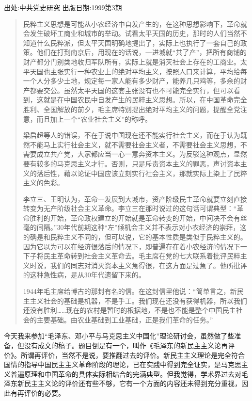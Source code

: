 \documentclass[UTF8, 12pt, a4paper]{ctexrep}
\begin{document}
出处:中共党史研究 出版日期:1999第3期

\begin{quotation}
    \footnotesize {
    民粹主义思想是可能从小农经济中自发产生的，在这种思想影响下，革命就会发生破坏工商业和城市的举动。试看太平天国的历史，那时的人们当然不知道什么民粹派，但太平天国明确地提出了，实际上也执行了一套自己的政策。他们在打到南京后，用现在的话说，一进城就“共了产”，把所有商铺的财产都分门别类地收归军队所有，实际上就是消灭社会上存在的工商业。太平天国也主张实行一种农业上的绝对平均主义，按照人口来计算，平均给每一个人分多少土地，规定每一家人能有多少财产，能养几只鸡等，多余的财产都要交公。虽然太平天国的这套主张没有也不可能完全实行，但可以看到，这就是在中国农民中自发产生的民粹主义思想。所以，在中国革命完全胜利、全国解放的前夕，毛主席特别提出绝对平均主义的问题，提醒全党注意，而且加上一个“农业社会主义”的称呼。

    梁启超等人的错误，不在于说中国现在还不能实行社会主义，而在于认为既然不能马上实行社会主义，就不需要社会主义者，不需要社会主义思想，不需要成立共产党，大家都应当一心一意奔资本主义。为反驳这种观点，显然要有较多的马克思主义才行。否则，只是斥责资本主义的罪恶，声讨资本主义的落后性，藉以论证中国应该立刻实行社会主义，那就实际上染上了民粹主义的色彩。

    李立三、王明认为，革命一发展到大城市，资产阶级民主革命就要立刻直接转变为无产阶级社会主义革命。李立三在那时说过的这句话可谓典型：“革命胜利的开始，革命政权建立的开始就是革命转变的开始，中间决不会有丝毫的间隔。”30年代前期这种“左”倾机会主义并不表示对小农经济的崇拜，这的确是和民粹主义不同的，但可以说，它的基本性质是类似于民粹主义的。因为它以为可以在经济很落后的情况下，即普遍存在着小农经济的情况下一下子将民主革命转到社会主义革命去。毛主席在党的七大联系着批评民粹主义时说，我们的同志对消灭资本主义急得很，在这方面是过急了。他所批评的这种急性病，是从30年代遗留下来的。

    1944年毛主席给博古的那封有名的信。在这封信里他说：“简单言之，新民主主义社会的基础是机器，不是手工。我们现在还没有获得机器，所以我们还没有胜利……现在的农村是暂时的根据地，不是也不能是整个中国民主社会的主要基础。由农业基础到工业基础，正是我们革命的任务。”
    }
\end{quotation}

\newpage

今天我来参加“毛泽东、邓小平与马克思主义中国化”理论研讨会，虽然做了些准备，但没有成文的稿子。题目倒是有一个，叫作《毛泽东的新民主主义论再评价》。所谓再评价，当然不是说，要推翻过去的评价。新民主主义理论是完全符合国情的指导中国民主主义革命阶段的理论，已在实践中得到完全证实，是马克思主义普遍原理和中国革命的具体实际相结合的完满典型。但我觉得，学术界过去对毛泽东新民主主义论的评价还有些不够，它有一个方面的内容还未得到充分重视，因此有再评价的必要。
\end{document}
